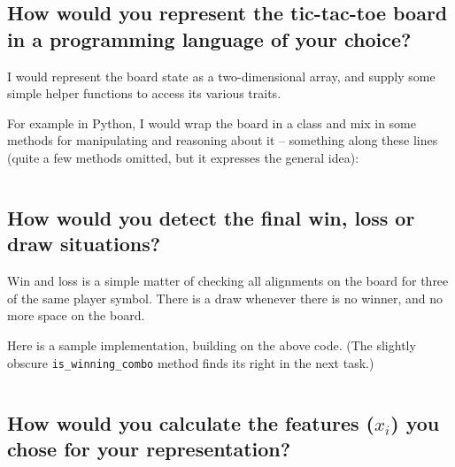 \documentclass[11pt,a4paper]{article}
\begin{document}
    
    \subsection{How would you represent the tic-tac-toe board in a programming language
of your choice?} %
    \label{sub:board_representation}
    
      I would represent the board state as a two-dimensional array, and supply some simple helper functions to access its various traits.
      
      For example in Python, I would wrap the board in a class and mix in some methods for manipulating and reasoning about it -- something along these lines (quite a few methods omitted, but it expresses the general idea):
      
      \inputminted[lastline=42,linenos=true]{python}{src/board.py}
    
    
    \subsection{How would you detect the final win, loss or draw situations?} %
    \label{sub:how_would_you_detect_the_final_win_loss_or_draw_situations}
    
      Win and loss is a simple matter of checking all alignments on the board for three of the same player symbol.
      There is a draw whenever there is no winner, and no more space on the board.
      
      Here is a sample implementation, building on the above code. (The slightly obscure \texttt{is\_winning\_combo} method finds its right in the next task.)
      
      \inputminted[firstline=44,firstnumber=44,lastline=72,linenos=true]{python}{src/board.py}
    
  
    \subsection{How would you calculate the features ($x_i$) you chose for your representation?} %
    \label{sub:how_would_you_calculate_the_features_x_i_you_chose_for_your_representation_}
    
\end{document}
